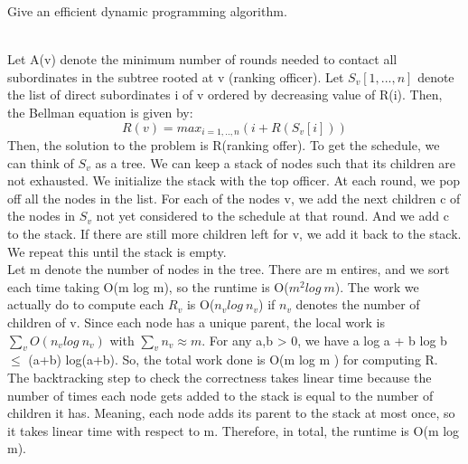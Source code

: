 \documentclass[solutionorbox,answers]{exam}
\begin{document}
\begin{questions}
\begin{parts}
\item Give an efficient dynamic programming algorithm.
\begin{solutionbox}{} \vspace{1em} \\
Let A(v) denote the minimum number of rounds needed to contact all subordinates in the subtree rooted at v (ranking officer). Let $S_{v}[1,...,n]$ denote the list of direct subordinates i of v ordered by decreasing value of R(i). Then, the Bellman equation is given by:
\[ R(v) = max_{i = 1,..,n} (i + R(S_{v}[i]))\]
Then, the solution to the problem is R(ranking offer).
To get the schedule, we can think of $S_{v}$ as a tree. We can keep a stack of nodes such that its children are not exhausted. We initialize the stack with the top officer. At each round, we pop off all the nodes in the list. For each of the nodes v, we add the next children c of the nodes in $S_{v}$ not yet considered to the schedule at that round. And we add c to the stack. If there are still more children left for v, we add it back to the stack. We repeat this until the stack is empty.\\
Let m denote the number of nodes in the tree. There are m entires, and we sort each time taking O(m log m), so the runtime is O($m^2 log\ m$). The work we actually do to compute each $R_{v}$ is O($n_{v} log\ n_{v}$) if $n_{v}$ denotes the number of children of v. Since each node has a unique parent, the local work is $\sum_{v} O(n_{v} log\ n_{v})$ with $\sum_{v} n_{v} \approx m$. For any a,b > 0, we have a log a + b log b $\leq$ (a+b) log(a+b). So, the total work done is O(m log m ) for computing R. The backtracking step to check the correctness takes linear time because the number of times each node gets added to the stack is equal to the number of children it has. Meaning, each node adds its parent to the stack at most once, so it takes linear time with respect to m. Therefore, in total, the runtime is O(m log m).
\end{solutionbox}

\newpage


\end{parts}
\end{questions}
\end{document}
